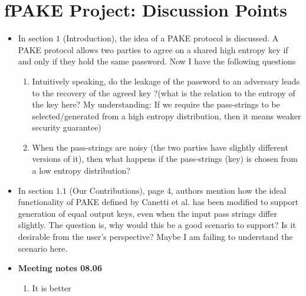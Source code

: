 \documentclass{article}
\begin{document}
\section{fPAKE Project: Discussion Points}
\begin{itemize}
\item In section $1$ (Introduction), the idea of a PAKE protocol is discussed. A PAKE protocol allows two parties to agree on a shared high entropy key if and only if they hold the same password. Now I have the following questions
\begin{enumerate}
\item Intuitively speaking, do the leakage of the password to an adversary leads to the recovery of the agreed key ?(what is the relation to the entropy of the key here? My understanding: If we require the pass-strings to be selected/generated from a high entropy distribution, then it means weaker security guarantee)
\item When the pass-strings are noisy (the two parties have slightly different versions of it), then what happens if the pass-strings (key) is chosen from a low entropy distribution?
\end{enumerate}
\item In section $1.1$ (Our Contributions), page 4, authors mention how the ideal functionality of PAKE defined by Canetti et al. has been modified to support generation of equal output keys, even when the input pass strings differ slightly. The question is, why would this be a good scenario to support? Is it desirable from the user's perspective? Maybe I am failing to understand the scenario here.
\item \textbf{Meeting notes 08.06}
\begin{enumerate}
\item It is better
\end{enumerate}
\end{itemize}
\end{document}
